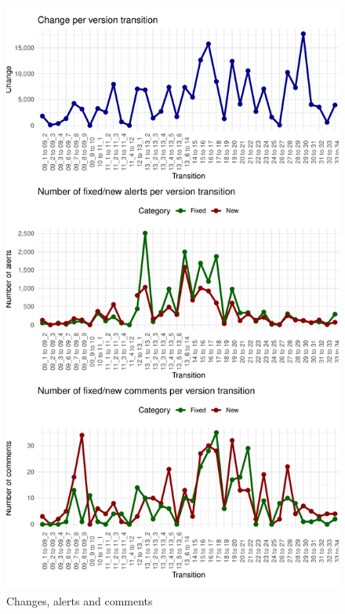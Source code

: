 \documentclass[
]{article}
\begin{document}
\small

\normalsize

\small

\begin{figure}
\centering
\includegraphics{report_files/figure-latex/unnamed-chunk-26-1.pdf}
\caption{\label{timeseries}Changes, alerts and comments}
\end{figure}

\normalsize

\newpage
\end{document}
